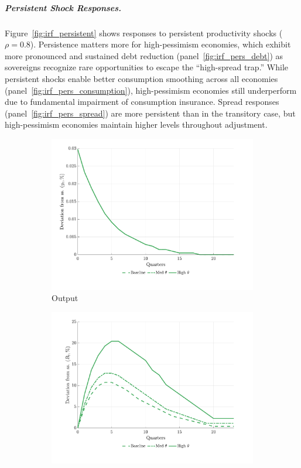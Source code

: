 \documentclass[12pt]{article}
\theoremstyle{plain}
\begin{document}
\subparagraph{Persistent Shock Responses.} Figure~\ref{fig:irf_persistent} shows responses to persistent productivity
shocks ($\rho = 0.8$). Persistence matters more for high-pessimism economies,
which exhibit more pronounced and sustained debt reduction
(panel~\ref{fig:irf_pers_debt}) as sovereigns recognize rare opportunities to
escape the ``high-spread trap.'' While persistent shocks enable better
consumption smoothing across all economies
(panel~\ref{fig:irf_pers_consumption}), high-pessimism economies still
underperform due to fundamental impairment of consumption insurance. Spread
responses (panel~\ref{fig:irf_pers_spread}) are more persistent than in the
transitory case, but high-pessimism economies maintain higher levels throughout
adjustment.

\begin{figure}[h]
	\centering
	\begin{subfigure}[b]{0.48\textwidth}
		\centering
		\includegraphics[width=\textwidth]{../../pessimism-default-model/results/comparison_figure_17.pdf}
		\caption{Output}
		\label{fig:irf_pers_output}
	\end{subfigure}
	\hfill
	\begin{subfigure}[b]{0.48\textwidth}
		\centering
		\includegraphics[width=\textwidth]{../../pessimism-default-model/results/comparison_figure_18.pdf}

\end{subfigure}
\end{figure}
\end{document}
